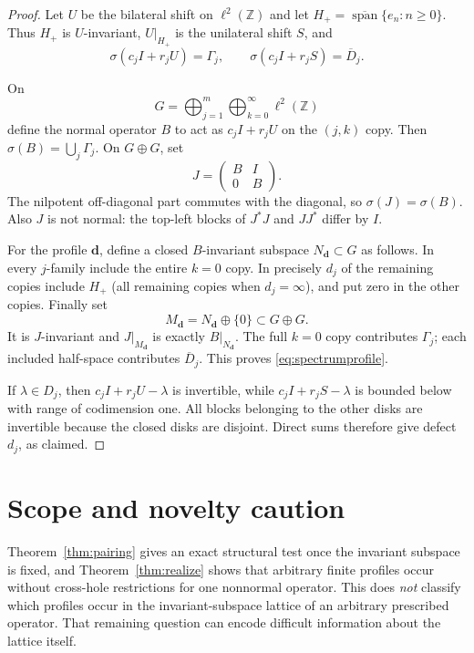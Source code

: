 \documentclass[11pt]{article}
\begin{document}
\begin{proof}
Let $U$ be the bilateral shift on $\ell^2(\mathbb Z)$ and let
$H_+=\overline{\operatorname{span}}\{e_n:n\ge0\}$.  Thus $H_+$ is
$U$-invariant, $U|_{H_+}$ is the unilateral shift $S$, and
\[
 \sigma(c_jI+r_jU)=\Gamma_j,
 \qquad
 \sigma(c_jI+r_jS)=\overline D_j.
\]

On
\[
 G=\bigoplus_{j=1}^m\bigoplus_{k=0}^{\infty}\ell^2(\mathbb Z)
\]
define the normal operator $B$ to act as $c_jI+r_jU$ on the $(j,k)$ copy.
Then $\sigma(B)=\bigcup_j\Gamma_j$.  On $G\oplus G$, set
\[
 J=\begin{pmatrix}B&I\\0&B\end{pmatrix}.
\]
The nilpotent off-diagonal part commutes with the diagonal, so
$\sigma(J)=\sigma(B)$.  Also $J$ is not normal: the top-left blocks of
$J^*J$ and $JJ^*$ differ by $I$.

For the profile $\boldsymbol d$, define a closed $B$-invariant subspace
$N_{\boldsymbol d}\subset G$ as follows.  In every $j$-family include the
entire $k=0$ copy.  In precisely $d_j$ of the remaining copies include
$H_+$ (all remaining copies when $d_j=\infty$), and put zero in the other
copies.  Finally set
\[
 M_{\boldsymbol d}=N_{\boldsymbol d}\oplus\{0\}\subset G\oplus G.
\]
It is $J$-invariant and $J|_{M_{\boldsymbol d}}$ is exactly
$B|_{N_{\boldsymbol d}}$.  The full $k=0$ copy contributes $\Gamma_j$;
each included half-space contributes $\overline D_j$.  This proves
\eqref{eq:spectrumprofile}.

If $\lambda\in D_j$, then $c_jI+r_jU-\lambda$ is invertible, while
$c_jI+r_jS-\lambda$ is bounded below with range of codimension one.  All
blocks belonging to the other disks are invertible because the closed disks
are disjoint.  Direct sums therefore give defect $d_j$, as claimed.
\end{proof}

\section{Scope and novelty caution}

Theorem~\ref{thm:pairing} gives an exact structural test once the invariant
subspace is fixed, and Theorem~\ref{thm:realize} shows that arbitrary finite
profiles occur without cross-hole restrictions for one nonnormal operator.
This does \emph{not} classify which profiles occur in the invariant-subspace
lattice of an arbitrary prescribed operator.  That remaining question can
encode difficult information about the lattice itself.
\end{document}
